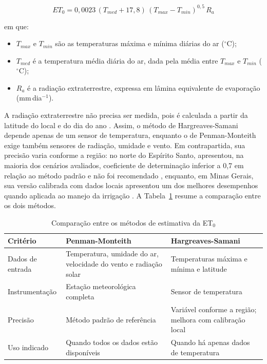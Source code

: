 \begin{equation}
  ET_0 = 0{,}0023\,(T_{med} + 17{,}8)\,(T_{max} - T_{min})^{0{,}5}\,R_a
  \label{eq:hargreaves}
\end{equation}
 
\noindent em que:
\begin{itemize}
  \item $T_{max}$ e $T_{min}$ são as temperaturas máxima e mínima diárias do
        ar ($^{\circ}$C);
  \item $T_{med}$ é a temperatura média diária do ar, dada pela média entre
        $T_{max}$ e $T_{min}$ ($^{\circ}$C);
  \item $R_a$ é a radiação extraterrestre, expressa em lâmina equivalente de
        evaporação (mm\,dia$^{-1}$).
\end{itemize}
 
A radiação extraterrestre não precisa ser medida, pois é calculada a partir da
latitude do local e do dia do ano \cite{allen1998}. Assim, o método de
Hargreaves-Samani depende apenas de um sensor de temperatura, enquanto o de
Penman-Monteith exige também sensores de radiação, umidade e vento. Em
contrapartida, sua precisão varia conforme a região: no norte do Espírito
Santo, apresentou, na maioria dos cenários avaliados, coeficiente de determinação inferior a 0,7 em relação ao
método padrão e não foi recomendado \cite{venancio2019}, enquanto, em Minas
Gerais, sua versão calibrada com dados locais apresentou um dos melhores
desempenhos quando aplicada ao manejo da irrigação \cite{ferreira2021}. A
Tabela~\ref{tab:et0} resume a comparação entre os dois métodos.
 
\begin{table}[htbp]
  \centering
  \caption{Comparação entre os métodos de estimativa da ET$_0$}
  \label{tab:et0}
  \begin{tabularx}{\textwidth}{>{\raggedright\arraybackslash}p{3.4cm}
                               >{\raggedright\arraybackslash}X
                               >{\raggedright\arraybackslash}X}
    \hline
    \textbf{Critério} & \textbf{Penman-Monteith} & \textbf{Hargreaves-Samani} \\
    \hline
    Dados de entrada & Temperatura, umidade do ar, velocidade do vento e
      radiação solar & Temperaturas máxima e mínima e latitude \\
    \hline
    Instrumentação & Estação meteorológica completa & Sensor de temperatura \\
    \hline
    Precisão & Método padrão de referência & Variável conforme a região;
      melhora com calibração local \\
    \hline
    Uso indicado & Quando todos os dados estão disponíveis & Quando há apenas
      dados de temperatura \\
    \hline
  \end{tabularx}
\end{table}

